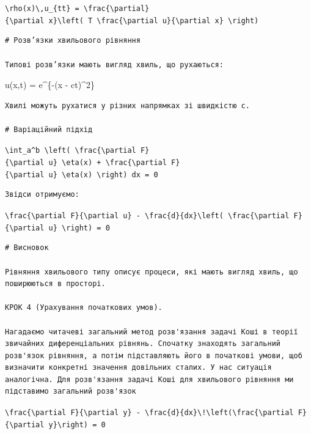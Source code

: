 \documentclass[
  ukrainian,
]{article}
\begin{document}
\texttt{\textbackslash{}rho(x)\textbackslash{},u\_\{tt\}\ =\ \textbackslash{}frac\{\textbackslash{}partial\}\{\textbackslash{}partial\ x\}\textbackslash{}left(\ T\ \textbackslash{}frac\{\textbackslash{}partial\ u\}\{\textbackslash{}partial\ x\}\ \textbackslash{}right)}

\begin{verbatim}
# Розв’язки хвильового рівняння

Типові розв’язки мають вигляд хвиль, що рухаються:
\end{verbatim}

u(x,t) = e\^{}\{-(x - ct)\^{}2\}

\begin{verbatim}
Хвилі можуть рухатися у різних напрямках зі швидкістю c.

# Варіаційний підхід
\end{verbatim}

\texttt{\textbackslash{}int\_a\^{}b\ \textbackslash{}left(\ \textbackslash{}frac\{\textbackslash{}partial\ F\}\{\textbackslash{}partial\ u\}\ \textbackslash{}eta(x)\ +\ \textbackslash{}frac\{\textbackslash{}partial\ F\}\{\textbackslash{}partial\ u\textquotesingle{}\}\ \textbackslash{}eta\textquotesingle{}(x)\ \textbackslash{}right)\ dx\ =\ 0}

\begin{verbatim}
Звідси отримуємо:
\end{verbatim}

\texttt{\textbackslash{}frac\{\textbackslash{}partial\ F\}\{\textbackslash{}partial\ u\}\ -\ \textbackslash{}frac\{d\}\{dx\}\textbackslash{}left(\ \textbackslash{}frac\{\textbackslash{}partial\ F\}\{\textbackslash{}partial\ u\textquotesingle{}\}\ \textbackslash{}right)\ =\ 0}

\begin{verbatim}
# Висновок

Рівняння хвильового типу описує процеси, які мають вигляд хвиль, що поширюються в просторі.

КРОК 4 (Урахування початкових умов).

Нагадаємо читачеві загальний метод розв'язання задачі Коші в теорії звичайних диференціальних рівнянь. Спочатку знаходять загальний розв'язок рівняння, а потім підставляють його в початкові умови, щоб визначити конкретні значення довільних сталих. У нас ситуація аналогічна. Для розв'язання задачі Коші для хвильового рівняння ми підставимо загальний розв'язок
\end{verbatim}

\texttt{\textbackslash{}frac\{\textbackslash{}partial\ F\}\{\textbackslash{}partial\ y\}\ -\ \textbackslash{}frac\{d\}\{dx\}\textbackslash{}!\textbackslash{}left(\textbackslash{}frac\{\textbackslash{}partial\ F\}\{\textbackslash{}partial\ y\textquotesingle{}\}\textbackslash{}right)\ =\ 0}
\end{document}
